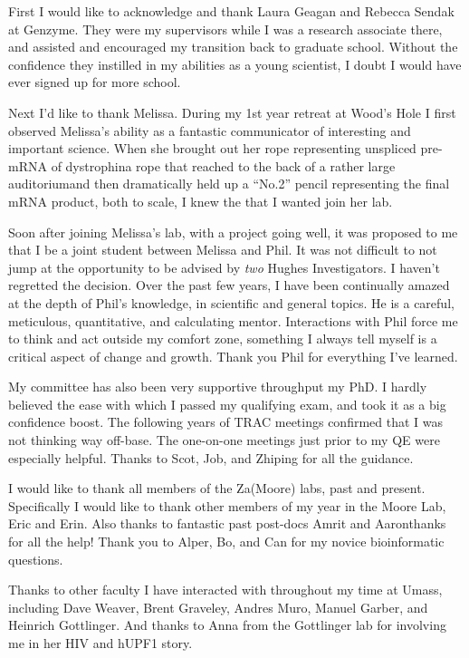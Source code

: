 \acknowledgements{}\label{hd:acknowledgements}

First I would like to acknowledge and thank Laura Geagan and Rebecca Sendak at Genzyme. They were my supervisors while I was a research associate there, and assisted and encouraged my transition back to graduate school. Without the confidence they instilled in my abilities as a young scientist, I doubt I would have ever signed up for more school. 

Next I’d like to thank Melissa. During my 1st year retreat at Wood’s Hole I first observed Melissa's ability as a fantastic communicator of interesting and important science. When she brought out her rope representing unspliced pre-mRNA of dystrophin\textendash a rope that reached to the back of a rather large auditorium\textendash and then dramatically held up a ``No.2'' pencil representing the final mRNA product, both to scale, I knew the that I wanted join her lab. 

Soon after joining Melissa’s lab, with a project going well, it was proposed to me that I be a joint student between Melissa and Phil. It was not difficult to not jump at the opportunity to be advised by \textit{two} Hughes Investigators. I haven’t regretted the decision. Over the past few years, I have been continually amazed at the depth of Phil’s knowledge, in scientific and general topics. He is a careful, meticulous, quantitative, and calculating mentor. Interactions with Phil force me to think and act outside my comfort zone, something I always tell myself is a critical aspect of change and growth. Thank you Phil for everything I’ve learned.

My committee has also been very supportive throughput my PhD. I hardly believed the ease with which I passed my qualifying exam, and took it as a big confidence boost. The following years of TRAC meetings confirmed that I was not thinking way off-base. The one-on-one meetings just prior to my QE were especially helpful. Thanks to Scot, Job, and Zhiping for all the guidance.

I would like to thank all members of the Za(Moore) labs, past and present. Specifically I would like to thank other members of my year in the Moore Lab, Eric and Erin. Also thanks to fantastic past post-docs Amrit and Aaron\textendash thanks for all the help! Thank you to Alper, Bo, and Can for my novice bioinformatic questions.

Thanks to other faculty I have interacted with throughout my time at Umass, including Dave Weaver, Brent Graveley, Andres Muro, Manuel Garber, and Heinrich Gottlinger. And thanks to Anna from the Gottlinger lab for involving me in her HIV and hUPF1 story.

